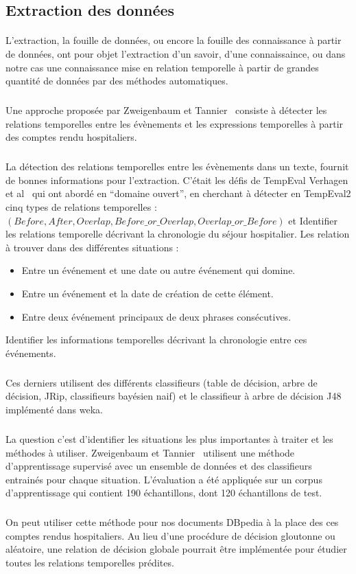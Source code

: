 \subsection*{Extraction des données}
\paragraph{}
L'extraction, la fouille de données, ou encore la fouille des connaissance à partir de données, ont pour  objet l'extraction d'un savoir, d'une connaissaince, ou dans notre cas une connaissance mise en relation temporelle à partir de grandes quantité de données par des méthodes automatiques.
\subparagraph{}
Une approche proposée par Zweigenbaum et Tannier~\cite{zweigenbaum2013} consiste à détecter les relations temporelles entre les évènements et les expressions temporelles à partir des comptes rendu hospitaliers.
\subparagraph{}
La détection des relations temporelles entre les évènements dans un texte, fournit de bonnes informations pour l’extraction.
\newline
C’était les défis de TempEval Verhagen et al~\cite{verhagen2010} qui ont abordé en “domaine ouvert”, en cherchant à détecter en TempEval2 cinq types de relations temporelles :
\newline
$(Before, After, Overlap, Before\_or\_Overlap, Overlap\_or\_Before)$
et Identifier les relations temporelle décrivant la chronologie du séjour hospitalier.
\newline
Les relation à trouver dans des différentes situations :
\begin{itemize}
\item{}Entre un événement et une date ou autre événement qui domine.
\item{}Entre un événement et la date de création de cette élément.
\item{}Entre deux événement principaux de deux phrases consécutives.
\end{itemize}
Identifier les informations temporelles décrivant la chronologie entre ces événements.
\subparagraph{}
Ces derniers utilisent des différents classifieurs (table de décision, arbre de décision, JRip, classifieurs bayésien naif) et le classifieur à arbre de décision J48 implémenté dans weka.
\subparagraph{}
La question c’est d’identifier les situations les plus importantes à traiter et les méthodes à utiliser.
Zweigenbaum et Tannier~\cite{zweigenbaum2013} utilisent une méthode d’apprentissage supervisé avec un ensemble de données et des classifieurs entrainés pour chaque situation. 
L'évaluation a été appliquée sur un corpus d’apprentissage qui contient 190 échantillons, dont 120 échantillons de test.
\subparagraph{}
On peut utiliser cette méthode pour nos documents DBpedia à la place des ces comptes rendus hospitaliers.
Au lieu d’une procédure de décision gloutonne ou aléatoire, une relation de décision globale pourrait être implémentée pour étudier toutes les relations temporelles prédites. 
